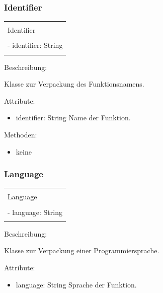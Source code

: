 \documentclass[a4paper,20pt,oneside]{book}
\begin{document}
	\subsubsection{Identifier}
		\centering
	\begin{tabular}{|l|}
	\hline \\
	Identifier\\
	\hline \\
	- identifier: String\\
    \hline \\
	\hline 
	\end{tabular}
	
	\raggedright
	\vspace{0.5cm}
	Beschreibung:
	
	Klasse zur Verpackung des Funktionsnamens.
	
	\vspace{0.5cm}
	Attribute:
	\begin{itemize}
	\item identifier: String \linebreak
	Name der Funktion.
    
	\end{itemize}
	
	Methoden:
	\begin{itemize}
	\item keine
	\end{itemize}
	
	\subsubsection{Language}
		\centering
	\begin{tabular}{|l|}
	\hline \\
	Language\\
	\hline \\
    - language: String\\
    \hline \\
	\hline 
	\end{tabular}
	
	\raggedright
	\vspace{0.5cm}
	Beschreibung:
	
	Klasse zur Verpackung einer Programmiersprache.
	
	\vspace{0.5cm}
	Attribute:
	\begin{itemize}
    \item language: String \linebreak
    Sprache der Funktion.
	\end{itemize}
	
\end{document}
